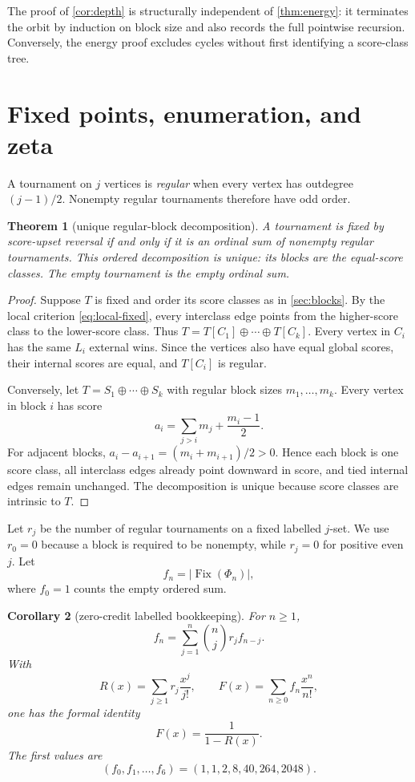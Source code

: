\documentclass[11pt,a4paper]{amsart}
\newtheorem{theorem}{Theorem}[section]
\newtheorem{corollary}[theorem]{Corollary}
\theoremstyle{definition}
\theoremstyle{remark}
\newcommand{\Fix}{\operatorname{Fix}}
\begin{document}
The proof of \cref{cor:depth} is structurally independent of
\cref{thm:energy}: it terminates the orbit by induction on block size and
also records the full pointwise recursion.  Conversely, the energy proof
excludes cycles without first identifying a score-class tree.

\section{Fixed points, enumeration, and zeta}\label{sec:fixed}

A tournament on $j$ vertices is \emph{regular} when every vertex has
outdegree $(j-1)/2$.  Nonempty regular tournaments therefore have odd
order.

\begin{theorem}[unique regular-block decomposition]\label{thm:fixed}
A tournament is fixed by score-upset reversal if and only if it is an
ordinal sum of nonempty regular tournaments.  This ordered decomposition is
unique: its blocks are the equal-score classes.  The empty tournament is
the empty ordinal sum.
\end{theorem}

\begin{proof}
Suppose $T$ is fixed and order its score classes as in
\cref{sec:blocks}.  By the local criterion \eqref{eq:local-fixed}, every
interclass edge points from the higher-score class to the lower-score class.
Thus $T=T[C_1]\oplus\cdots\oplus T[C_k]$.  Every vertex in $C_i$ has the
same $L_i$ external wins.  Since the vertices also have equal global
scores, their internal scores are equal, and $T[C_i]$ is regular.

Conversely, let $T=S_1\oplus\cdots\oplus S_k$ with regular block sizes
$m_1,\ldots,m_k$.  Every vertex in block $i$ has score
\[
 a_i=\sum_{j>i}m_j+\frac{m_i-1}{2}.
\]
For adjacent blocks,
$a_i-a_{i+1}=(m_i+m_{i+1})/2>0$.  Hence each block is one score class,
all interclass edges already point downward in score, and tied internal
edges remain unchanged.  The decomposition is unique because score classes
are intrinsic to $T$.
\end{proof}

Let $r_j$ be the number of regular tournaments on a fixed labelled
$j$-set.  We use $r_0=0$ because a block is required to be nonempty, while
$r_j=0$ for positive even $j$.  Let
\[
                 f_n=|\Fix(\Phi_n)|,
\]
where $f_0=1$ counts the empty ordered sum.

\begin{corollary}[zero-credit labelled bookkeeping]
\label{cor:enumeration}
For $n\geq1$,
\begin{equation}\label{eq:fixed-rec}
 \boxed{\displaystyle
 f_n=\sum_{j=1}^n\binom nj r_jf_{n-j}.}
\end{equation}
With
\[
 R(x)=\sum_{j\geq1}r_j\frac{x^j}{j!},\qquad
 F(x)=\sum_{n\geq0}f_n\frac{x^n}{n!},
\]
one has the formal identity
\begin{equation}\label{eq:egf}
                       \boxed{F(x)=\frac{1}{1-R(x)}.}
\end{equation}
The first values are
\[
 (f_0,f_1,\ldots,f_6)=(1,1,2,8,40,264,2048).
\]
\end{corollary}
\end{document}
